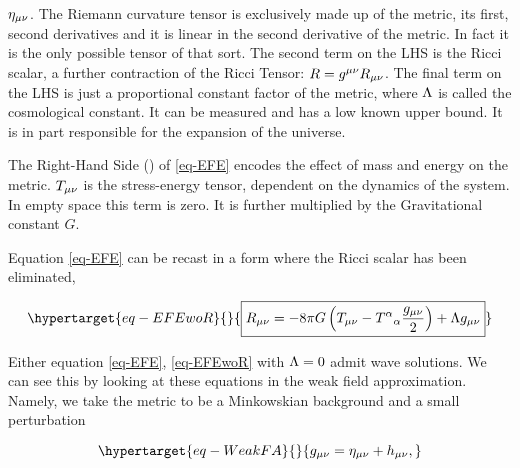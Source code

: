 \documentclass[
  letterpaper,
  DIV=11,
  numbers=noendperiod,
  oneside]{scrreprt}
\begin{document}
\(\texttip{\texttip{\eta}{Minkoski metric tensor +---}_{{\mu\nu}}}{covariant Minkoski metric components +---}\).
The Riemann curvature tensor is exclusively made up of the metric, its
first, second derivatives and it is linear in the second derivative of
the metric. In fact it is the only possible tensor of that sort. The
second term on the {LHS} is the Ricci scalar, a further contraction of
the Ricci Tensor:
\(\texttip{R}{Ricci scalar}= \texttip{\texttip{g}{metric tensor}^{{\mu\nu}}}{contravariant metric tensor component}\texttip{\texttip{R}{Ricci tensor}_{{\mu\nu}}}{covariant Ricci tensor component}\).
The final term on the {LHS} is just a proportional constant factor of
the metric, where \(\texttip{\Lambda}{cosmological constant}\) is called
the cosmological constant. It can be measured and has a low known upper
bound. It is in part responsible for the expansion of the universe.

The Right-Hand Side () of \ref{eq-EFE} encodes the effect of mass and
energy on the metric.
\(\texttip{\texttip{T}{Stress-Energy tensor, or energy-momentum tensor}_{{\mu\nu}}}{covariant Stress-Energy tensor component}\)
is the stress-energy tensor, dependent on the dynamics of the system. In
empty space this term is zero. It is further multiplied by the
Gravitational constant \(G\).

Equation \ref{eq-EFE} can be recast in a form where the Ricci scalar has
been eliminated,

\begin{equation}\protect\hypertarget{eq-EFEwoR}{}{
\boxed{\texttip{\texttip{R}{Ricci tensor}_{{\mu\nu}}}{covariant Ricci tensor component}=-8 \pi G\left(\texttip{\texttip{T}{Stress-Energy tensor, or energy-momentum tensor}_{{\mu\nu}}}{covariant Stress-Energy tensor component}-\texttip{\texttip{T}{Stress-Energy tensor, or energy-momentum tensor}^{\alpha}{}_{\alpha}}{Stress-Energy tensor trace}\frac{\texttip{\texttip{g}{metric tensor}_{{\mu\nu}}}{covariant metric tensor component}}{2}\right)+\texttip{\Lambda}{cosmological constant}\texttip{\texttip{g}{metric tensor}_{{\mu\nu}}}{covariant metric tensor component}} 
}\label{eq-EFEwoR}\end{equation}

Either equation \ref{eq-EFE}, \ref{eq-EFEwoR} with
\(\texttip{\Lambda}{cosmological constant}=0\) admit wave solutions. We
can see this by looking at these equations in the weak field
approximation. Namely, we take the metric to be a Minkowskian background
and a small perturbation

\begin{equation}\protect\hypertarget{eq-WeakFA}{}{
    \texttip{\texttip{g}{metric tensor}_{{\mu\nu}}}{covariant metric tensor component}= \texttip{\texttip{\eta}{Minkoski metric tensor +---}_{{\mu\nu}}}{covariant Minkoski metric components +---}+ \texttip{\texttip{h}{weak metric tensor}_{{\mu\nu}}}{weak covariant metric tensor component},
}\label{eq-WeakFA}\end{equation}
\end{document}
